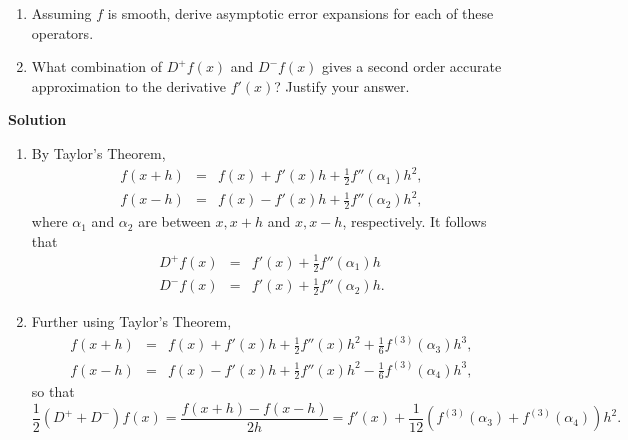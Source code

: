 \documentclass{article}
\begin{document}
\begin{enumerate}
\begin{enumerate}
\item Assuming \(f\) is smooth, derive asymptotic error expansions for each of these operators.

\item What combination of \(D^+f(x)\) and \(D^-f(x)\) gives a second order accurate approximation to the derivative \(f'(x)\)?  Justify your answer.

\end{enumerate}

{\bf Solution}

\begin{enumerate}
\item By Taylor's Theorem,
\begin{eqnarray*}
f(x + h) & = & f(x) + f'(x)h + \frac{1}{2} f''(\alpha_1) h^2, \\
f(x - h) & = & f(x) - f'(x)h + \frac{1}{2} f''(\alpha_2) h^2,
\end{eqnarray*}
where \(\alpha_1\) and \(\alpha_2\) are between \(x,x+h\) and \(x,x-h\), respectively.  It follows that
\begin{eqnarray*}
D^+f(x) & = & f'(x) + \frac{1}{2} f''(\alpha_1) h \\
D^-f(x) & = & f'(x) + \frac{1}{2} f''(\alpha_2) h.
\end{eqnarray*}

\item Further using Taylor's Theorem,
\begin{eqnarray*}
f(x + h) & = & f(x) + f'(x) h + \frac{1}{2} f''(x) h^2 + \frac{1}{6} f^{(3)}(\alpha_3) h^3, \\
f(x - h) & = & f(x) - f'(x) h + \frac{1}{2} f''(x) h^2 - \frac{1}{6} f^{(3)}(\alpha_4) h^3,
\end{eqnarray*}
so that
\[\frac{1}{2} \left( D^+ + D^- \right) f(x)
  = \frac{f(x + h) - f(x - h)}{2h}
  = f'(x) + \frac{1}{12} \left( f^{(3)}(\alpha_3) + f^{(3)}(\alpha_4) \right) h^2.\]

\end{enumerate}




\end{enumerate}
\end{document}
